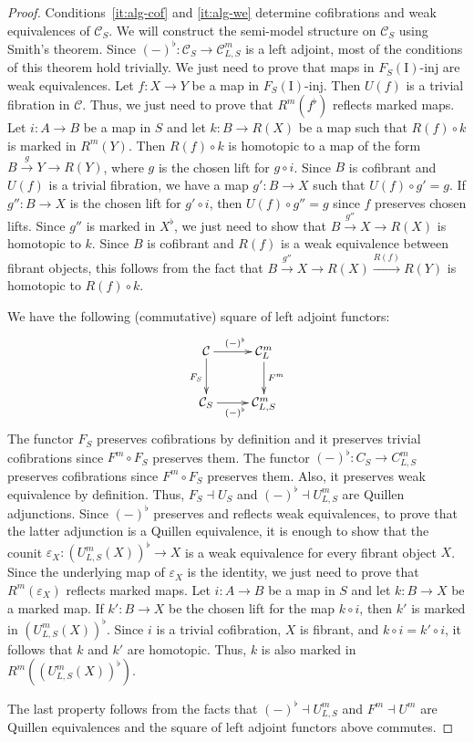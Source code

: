 \documentclass[reqno]{amsart}
\theoremstyle{definition}
\theoremstyle{remark}
\newcommand{\fs}[1]{\mathrm{#1}}
\newcommand{\cat}[1]{\mathcal{#1}}
\newcommand{\C}{\cat{C}}
\newcommand{\I}{\fs{I}}
\newcommand{\class}[2]{#1\text{-}\mathrm{#2}}
\newcommand{\Iinj}[1][\I]{\class{#1}{inj}}
\numberwithin{figure}{section}
\begin{document}
\begin{proof}
Conditions~\eqref{it:alg-cof} and \eqref{it:alg-we} determine cofibrations and weak equivalences of $\C_S$.
We will construct the semi-model structure on $\C_S$ using Smith's theorem.
Since $(-)^\flat : \C_S \to \C^m_{L,S}$ is a left adjoint, most of the conditions of this theorem hold trivially.
We just need to prove that maps in $\Iinj[F_S(\I)]$ are weak equivalences.
Let $f : X \to Y$ be a map in $\Iinj[F_S(\I)]$.
Then $U(f)$ is a trivial fibration in $\C$.
Thus, we just need to prove that $R^m(f^\flat)$ reflects marked maps.
Let $i : A \to B$ be a map in $S$ and let $k : B \to R(X)$ be a map such that $R(f) \circ k$ is marked in $R^m(Y)$.
Then $R(f) \circ k$ is homotopic to a map of the form $B \xrightarrow{g} Y \to R(Y)$, where $g$ is the chosen lift for $g \circ i$.
Since $B$ is cofibrant and $U(f)$ is a trivial fibration, we have a map $g' : B \to X$ such that $U(f) \circ g' = g$.
If $g'' : B \to X$ is the chosen lift for $g' \circ i$, then $U(f) \circ g'' = g$ since $f$ preserves chosen lifts.
Since $g''$ is marked in $X^\flat$, we just need to show that $B \xrightarrow{g''} X \to R(X)$ is homotopic to $k$.
Since $B$ is cofibrant and $R(f)$ is a weak equivalence between fibrant objects, this follows from the fact that $B \xrightarrow{g''} X \to R(X) \xrightarrow{R(f)} R(Y)$ is homotopic to $R(f) \circ k$.

We have the following (commutative) square of left adjoint functors:
\[ \xymatrix{ \C \ar[r]^{(-)^\flat} \ar[d]_{F_S} & \C^m_L \ar[d]^{F^m} \\
              \C_S \ar[r]_{(-)^\flat}            & \C^m_{L,S}
            } \]
The functor $F_S$ preserves cofibrations by definition and it preserves trivial cofibrations since $F^m \circ F_S$ preserves them.
The functor $(-)^\flat : C_S \to C^m_{L,S}$ preserves cofibrations since $F^m \circ F_S$ preserves them.
Also, it preserves weak equivalence by definition.
Thus, $F_S \dashv U_S$ and $(-)^\flat \dashv U^m_{L,S}$ are Quillen adjunctions.
Since $(-)^\flat$ preserves and reflects weak equivalences, to prove that the latter adjunction is a Quillen equivalence, it is enough to show that the counit $\varepsilon_X : (U^m_{L,S}(X))^\flat \to X$ is a weak equivalence for every fibrant object $X$.
Since the underlying map of $\varepsilon_X$ is the identity, we just need to prove that $R^m(\varepsilon_X)$ reflects marked maps.
Let $i : A \to B$ be a map in $S$ and let $k : B \to X$ be a marked map.
If $k' : B \to X$ be the chosen lift for the map $k \circ i$, then $k'$ is marked in $(U^m_{L,S}(X))^\flat$.
Since $i$ is a trivial cofibration, $X$ is fibrant, and $k \circ i = k' \circ i$, it follows that $k$ and $k'$ are homotopic.
Thus, $k$ is also marked in $R^m((U^m_{L,S}(X))^\flat)$.

The last property follows from the facts that $(-)^\flat \dashv U^m_{L,S}$ and $F^m \dashv U^m$ are Quillen equivalences and the square of left adjoint functors above commutes.
\end{proof}
\end{document}
